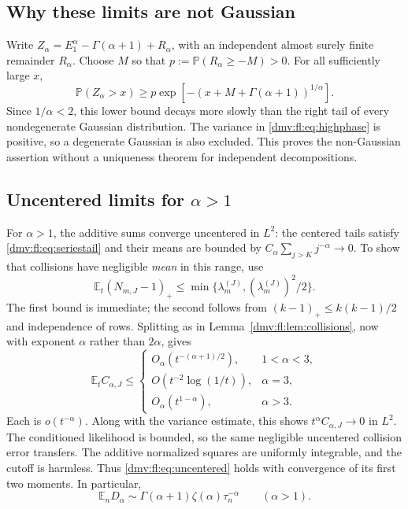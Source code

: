 \documentclass[11pt,letterpaper]{article}
\numberwithin{equation}{section}
\theoremstyle{definition}\newtheorem{definition}[theorem]{Definition}
\theoremstyle{remark}\newtheorem{remark}[theorem]{Remark}
\newcommand{\E}{\mathbb E}
\newcommand{\Pp}{\mathbb P}
\begin{document}
\subsection{Why these limits are not Gaussian}
Write
$Z_\alpha=E_1^\alpha-\Gamma(\alpha+1)+R_\alpha$, with an independent
almost surely finite remainder $R_\alpha$. Choose $M$ so that
$p:=\Pp(R_\alpha\ge-M)>0$. For all sufficiently large $x$,
\begin{equation}\label{dmv:fl:eq:nonGaussiantail}
 \Pp(Z_\alpha>x)
 \ge p\exp\left[-(x+M+\Gamma(\alpha+1))^{1/\alpha}\right].
\end{equation}
Since $1/\alpha<2$, this lower bound decays more slowly than the
right tail of every nondegenerate Gaussian distribution. The variance
in \eqref{dmv:fl:eq:highphase} is positive, so a degenerate Gaussian is also
excluded. This proves the non-Gaussian assertion without a uniqueness
theorem for independent decompositions.

\subsection{Uncentered limits for \texorpdfstring{$\alpha>1$}{alpha greater than one}}
For $\alpha>1$, the additive sums converge uncentered in $L^2$:
the centered tails satisfy \eqref{dmv:fl:eq:seriestail} and their means are
bounded by $C_\alpha\sum_{j>K}j^{-\alpha}\to0$.
To show that collisions have negligible \emph{mean} in this range,
use
\[
 \E_t(N_{m,J}-1)_+
 \le\min\{\lambda_m^{(J)},(\lambda_m^{(J)})^2/2\}.
\]
The first bound is immediate; the second follows from
$(k-1)_+\le k(k-1)/2$ and independence of rows. Splitting as in
Lemma~\ref{dmv:fl:lem:collisions}, now with exponent $\alpha$ rather than
$2\alpha$, gives
\begin{equation}\label{dmv:fl:eq:collisionmean}
 \E_tC_{\alpha,J}\le
 \begin{cases}
 O_\alpha(t^{-(\alpha+1)/2}),&1<\alpha<3,\\
 O(t^{-2}\log(1/t)),&\alpha=3,\\
 O_\alpha(t^{1-\alpha}),&\alpha>3.
 \end{cases}
\end{equation}
Each is $o(t^{-\alpha})$. Along with the variance estimate, this
shows $t^\alpha C_{\alpha,J}\to0$ in $L^2$.
The conditioned likelihood is bounded, so the same negligible
uncentered collision error transfers. The additive normalized squares
are uniformly integrable, and the cutoff is harmless. Thus
\eqref{dmv:fl:eq:uncentered} holds with convergence of its first two moments.
In particular,
\begin{equation}\label{dmv:fl:eq:highmean}
 \E_nD_\alpha\sim\Gamma(\alpha+1)\zeta(\alpha)\tau_n^{-\alpha}
 \qquad(\alpha>1).
\end{equation}
\end{document}
